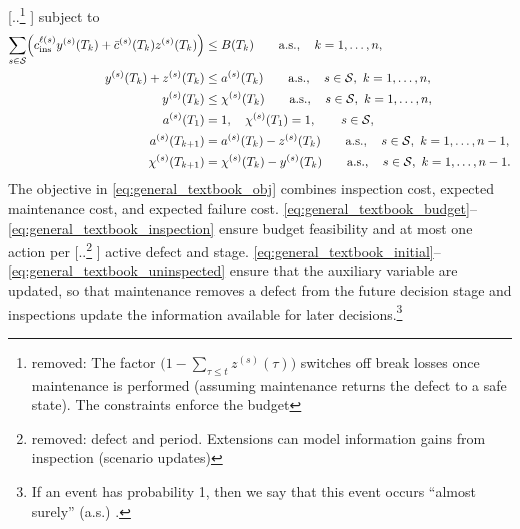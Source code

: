 \documentclass{article}
\providecommand{\DIFadd}[1]{{\protect\color{blue} \sf #1}} %
\providecommand{\DIFdel}[1]{{\protect\color{red} [..\footnote{removed: #1} ]}} %
\providecommand{\DIFaddbegin}{} %
\providecommand{\DIFaddend}{} %
\providecommand{\DIFdelbegin}{} %
\providecommand{\DIFdelend}{} %
\begin{document}
\DIFdelbegin \DIFdel{The factor $\bigl(1-\sum_{\tau\le t} z^{(s)}(\tau)\bigr)$ switches off break losses once maintenance is performed (assuming maintenance returns the defect to a safe state). 
The constraints enforce the budget }\DIFdelend \DIFaddbegin \DIFadd{subject to
}\begin{align}
\sum_{s\in\mathcal S}
\Bigl(
c^{\ell(s)}_{\mathrm{ins}} y^{(s)} (T_k)
+ \bar c^{(s)}(T_k) z^{(s)}(T_k)
\Bigr)
&\le B(T_k)
\qquad \text{a.s.},\quad k = 1,\dots,n,
\label{eq:general_textbook_budget}\\
y^{(s)}(T_k)+z^{(s)}(T_k)
&\le a^{(s)}(T_k)
\qquad \text{a.s.},\quad s\in\mathcal S,\  k = 1,\dots,n,
\label{eq:general_textbook_exclusive}\\
y^{(s)}(T_k)
&\le \chi^{(s)}(T_k)
\qquad \text{a.s.},\quad s\in\mathcal S,\  k = 1,\dots,n,
\label{eq:general_textbook_inspection}\\
a^{(s)}(T_1)&=1,\quad \chi^{(s)}(T_1)=1,
\qquad s\in\mathcal S,
\label{eq:general_textbook_initial}\\
a^{(s)}(T_{k+1})&=a^{(s)}(T_k)-z^{(s)}(T_k)
\qquad \text{a.s.},\quad s\in\mathcal S,\ k=1,\dots,n-1,
\label{eq:general_textbook_activity}\\
\chi^{(s)}(T_{k+1})&=\chi^{(s)}(T_k)-y^{(s)}(T_k)
\qquad \text{a.s.},\quad s\in\mathcal S,\ k=1,\dots,n-1.
\label{eq:general_textbook_uninspected}
\end{align}
\DIFadd{The objective in \cref{eq:general_textbook_obj} combines inspection cost, expected maintenance cost, and expected failure cost. 
\cref{eq:general_textbook_budget}--\cref{eq:general_textbook_inspection} ensure budget feasibility }\DIFaddend and at most one action per \DIFdelbegin \DIFdel{defect and period.
Extensions can model information gains from inspection (scenario updates)}\DIFdelend \DIFaddbegin \DIFadd{active defect and stage.
\cref{eq:general_textbook_initial}--\cref{eq:general_textbook_uninspected} ensure that the auxiliary variable are updated, so that maintenance removes a defect from the future decision stage and inspections update the information available for later decisions.}\footnote{\DIFadd{If an event has probability 1, then we say that this event occurs ``almost surely'' (a.s.) \citep[Chapter 3]{thygesen2023a}.}}
\end{document}
